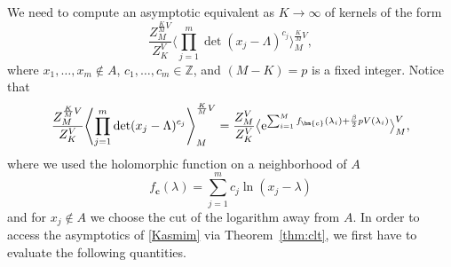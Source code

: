 \documentclass[10pt,a4paper]{amsart}
\numberwithin{equation}{section}
\begin{document}
We need to compute an asymptotic equivalent as $K \rightarrow \infty$ of kernels of the form
\begin{equation*}
 \frac{Z_{M}^{\frac{K}{M}V}}{Z_K^V} \Biggl\langle\prod_{j=1}^{m}\det(x_{j} - \Lambda)^{c_{j}}\Biggr\rangle^{\frac{K}{M}V}_{M},
\end{equation*}
where $x_{1}, \ldots, x_{m} \notin A$, $c_{1}, \ldots, c_{m} \in \mathbb{Z}$, and $(M - K) = p$ is a fixed integer. Notice that
\begin{equation}
 \label{Kasmim}
 \frac{Z_{M}^{\frac{K}{M}V}}{Z_K^V}\Biggl\langle\prod_{j=1}^{m}\det(x_{j} - \Lambda)^{c_{j}}\Biggr\rangle^{\frac{K}{M}V}_{M} = \frac{Z_M^{V}}{Z_K^{V}} \bigl\langle{\rm e}^{\sum_{i=1}^{M} f_{\bm{c}}(\lambda_{i}) + \frac{\beta}{2}pV(\lambda_i)}\bigr\rangle^{V}_{M},
\end{equation}
where we used the holomorphic function on a neighborhood of $A$
\begin{equation*}
 f_{\bm{c}}(\lambda) = \sum_{j=1}^{m}c_{j}\ln(x_{j} - \lambda)
\end{equation*}
and for $x_j \notin A$ we choose the cut of the logarithm away from $A$. In order to access the asymptotics of \eqref{Kasmim} via Theorem~\ref{thm:clt}, we first have to evaluate the following quantities.
\end{document}
